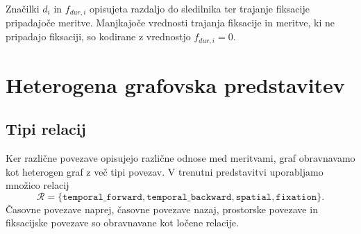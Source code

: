 Značilki $d_i$ in $f_{dur,i}$ opisujeta razdaljo do sledilnika ter trajanje fiksacije pripadajoče meritve.
Manjkajoče vrednosti trajanja fiksacije in meritve, ki ne pripadajo fiksaciji, so kodirane z vrednostjo $f_{dur,i}=0$.

\section{Heterogena grafovska predstavitev}
\label{subsec:heterogeni-graf}


\subsection{Tipi relacij}

Ker različne povezave opisujejo različne odnose med meritvami, graf obravnavamo kot heterogen graf z več tipi povezav.
V trenutni predstavitvi uporabljamo množico relacij
\begin{equation}
    \mathcal{R} =
    \{\texttt{temporal\_forward}, \texttt{temporal\_backward}, \texttt{spatial}, \texttt{fixation}\}.
\end{equation}
Časovne povezave naprej, časovne povezave nazaj, prostorske povezave in fiksacijske povezave so obravnavane kot ločene relacije.



